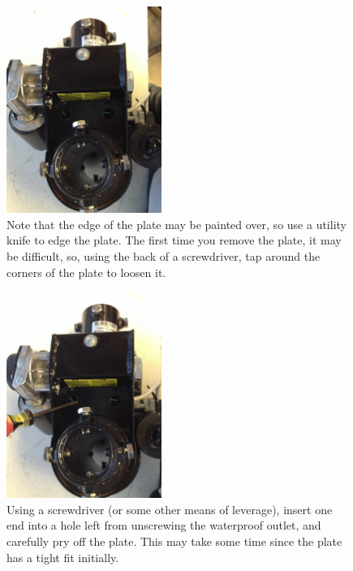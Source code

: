 \documentclass[11pt]{article} %
\begin{document}
\begin{figure}
  \centering
  \caption{Note that the edge of the plate may be painted over, so use a utility knife to edge the plate. The first time you remove the plate, it may be difficult, so, using the back of a screwdriver, tap around the corners of the plate to loosen it. }
  \includegraphics[width=0.45\textwidth]{wiring/03.jpeg}
\end{figure}


\begin{figure}
  \centering
  \caption{Using a screwdriver (or some other means of leverage), insert one end into a hole left from unscrewing the waterproof outlet, and carefully pry off the plate. This may take some time since the plate has a tight fit initially.}
  \includegraphics[width=0.45\textwidth]{wiring/04.jpeg}
\end{figure}
\end{document}
